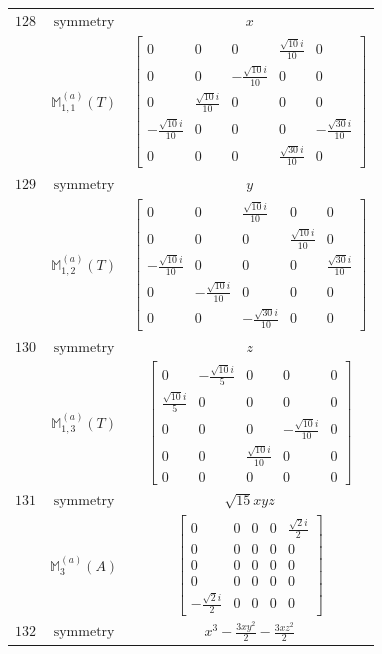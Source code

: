 \documentclass[fleqn,8pt,landscape]{jsarticle}
\begin{document}
\begin{longtable}{ccc}
$ 128 $ & $ \text{symmetry} $ & $ x $ \\
$  $ & $ \mathbb{M}_{1,1}^{(a)}(T) $ & $ \begin{bmatrix} 0 & 0 & 0 & \frac{\sqrt{10} i}{10} & 0 \\ 0 & 0 & - \frac{\sqrt{10} i}{10} & 0 & 0 \\ 0 & \frac{\sqrt{10} i}{10} & 0 & 0 & 0 \\ - \frac{\sqrt{10} i}{10} & 0 & 0 & 0 & - \frac{\sqrt{30} i}{10} \\ 0 & 0 & 0 & \frac{\sqrt{30} i}{10} & 0 \end{bmatrix} $ \\ \hline
$ 129 $ & $ \text{symmetry} $ & $ y $ \\
$  $ & $ \mathbb{M}_{1,2}^{(a)}(T) $ & $ \begin{bmatrix} 0 & 0 & \frac{\sqrt{10} i}{10} & 0 & 0 \\ 0 & 0 & 0 & \frac{\sqrt{10} i}{10} & 0 \\ - \frac{\sqrt{10} i}{10} & 0 & 0 & 0 & \frac{\sqrt{30} i}{10} \\ 0 & - \frac{\sqrt{10} i}{10} & 0 & 0 & 0 \\ 0 & 0 & - \frac{\sqrt{30} i}{10} & 0 & 0 \end{bmatrix} $ \\ \hline
$ 130 $ & $ \text{symmetry} $ & $ z $ \\
$  $ & $ \mathbb{M}_{1,3}^{(a)}(T) $ & $ \begin{bmatrix} 0 & - \frac{\sqrt{10} i}{5} & 0 & 0 & 0 \\ \frac{\sqrt{10} i}{5} & 0 & 0 & 0 & 0 \\ 0 & 0 & 0 & - \frac{\sqrt{10} i}{10} & 0 \\ 0 & 0 & \frac{\sqrt{10} i}{10} & 0 & 0 \\ 0 & 0 & 0 & 0 & 0 \end{bmatrix} $ \\ \hline
$ 131 $ & $ \text{symmetry} $ & $ \sqrt{15} x y z $ \\
$  $ & $ \mathbb{M}_{3}^{(a)}(A) $ & $ \begin{bmatrix} 0 & 0 & 0 & 0 & \frac{\sqrt{2} i}{2} \\ 0 & 0 & 0 & 0 & 0 \\ 0 & 0 & 0 & 0 & 0 \\ 0 & 0 & 0 & 0 & 0 \\ - \frac{\sqrt{2} i}{2} & 0 & 0 & 0 & 0 \end{bmatrix} $ \\ \hline
$ 132 $ & $ \text{symmetry} $ & $ x^{3} - \frac{3 x y^{2}}{2} - \frac{3 x z^{2}}{2} $ \\

\end{longtable}
\end{document}
